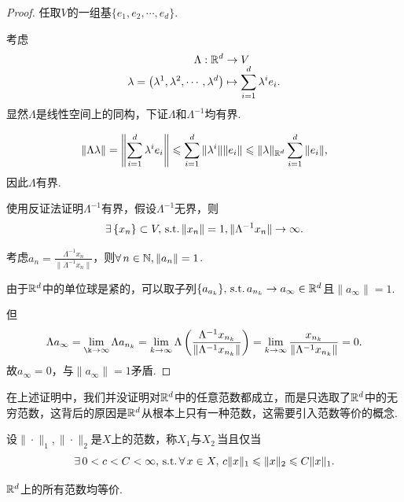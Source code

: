 \begin{proof}
    任取$V$的一组基$\{e_1,e_2,\cdots,e_d\}$.\par
    考虑\begin{align*}
        \Lambda:\mathbb{R}^d &\to V \\[-6pt]
        \lambda=\left(\lambda^1,\lambda^2,\cdots,\lambda^d\right) &\mapsto \sum_{i=1}^d{\lambda^i e_i}.
    \end{align*}显然$\Lambda$是线性空间上的同构，下证$\Lambda$和$\Lambda^{-1}$均有界.\par
    \begin{equation*}
    \|\Lambda\lambda\|=\left\|\sum_{i=1}^d\lambda^i e_i\right\|\leqslant\sum_{i=1}^d\|\lambda^i\|\|e_i\|\leqslant\|\lambda\|_{\mathbb{R}^d}\sum_{i=1}^d\|e_i\|,
    \end{equation*}
    因此$\Lambda$有界.\par
    使用反证法证明$\Lambda^{-1}$有界，假设$\Lambda^{-1}$无界，则
    \begin{equation*}
        \exists\, \{x_n\}\subset V,\operatorname{\,\text{s.t.}} \|x_n\|=1,\|\Lambda^{-1}x_n\|\to\infty.
    \end{equation*}\par
    考虑$a_n=\frac{\Lambda^{-1}x_n}{\|\Lambda^{-1}x_n\|}$，则$\forall\, n\in\mathbb{N},\|a_n\|=1$.\par
    由于$\mathbb{R}^d$中的单位球是紧的，可以取子列$\{a_{a_k}\},\operatorname{\,\text{s.t.}} a_{n_k}\to a_\infty\in\mathbb{R}^d$且$\|a_\infty\|=1$.\par
    但
    \begin{equation*}
        \Lambda a_\infty=\lim_{\k\to\infty}\Lambda a_{n_k}=\lim_{k\to\infty}\Lambda\left(\frac{\Lambda^{-1}x_{n_k}}{\|\Lambda^{-1}x_{n_k}\|}\right)=\lim_{k\to\infty}\frac{x_{n_k}}{\|\Lambda^{-1}x_{n_k}\|}=0.
    \end{equation*}
    故$a_\infty=0$，与$\|a_\infty\|=1$矛盾.
\end{proof}
在上述证明中，我们并没证明对$\mathbb{R}^d$中的任意范数都成立，而是只选取了$\mathbb{R}^d$中的无穷范数，这背后的原因是$\mathbb{R}^d$从根本上只有一种范数，这需要引入范数等价的概念.
\begin{definition}[范数的等价]
    设$\|\cdot\|_1,\|\cdot\|_2$是$X$上的范数，称$X_1$与$X_2$\,当且仅当
    \begin{equation*}
        \exists\,0<c<C<\infty,\operatorname{\,\text{s.t.}}\forall\, x\in X,\,c\|x\|_1\leqslant \|x\|_2\leqslant C\|x\|_1.
    \end{equation*}
\end{definition}
\begin{corollary}[有限维赋范空间范数的等价性]
   $\mathbb{R}^d$上的所有范数均等价. 
\end{corollary}
